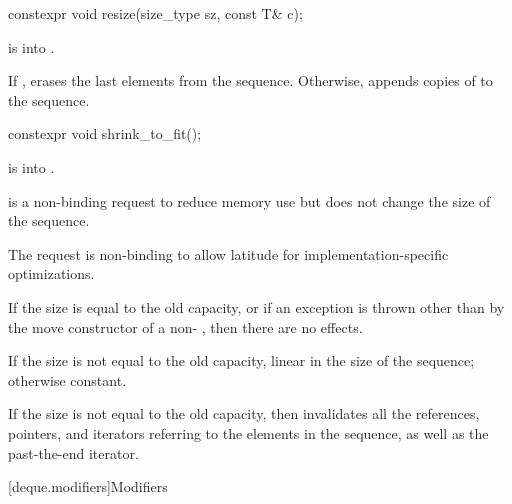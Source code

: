 %
\begin{itemdecl}
constexpr void resize(size_type sz, const T& c);
\end{itemdecl}

\begin{itemdescr}
\pnum
\expects
{} is  into .

\pnum
\effects
If , erases the last  elements
from the sequence. Otherwise,
appends  copies of  to the sequence.
\end{itemdescr}

%
\begin{itemdecl}
constexpr void shrink_to_fit();
\end{itemdecl}

\begin{itemdescr}
\pnum
\expects
{} is  into .

\pnum
\effects
{} is a non-binding request to reduce memory use
but does not change the size of the sequence.
\begin{note}
The request is non-binding to allow latitude for
implementation-specific optimizations.
\end{note}
If the size is equal to the old capacity, or
if an exception is thrown other than by the move constructor
of a non- ,
then there are no effects.

\pnum
\complexity
If the size is not equal to the old capacity,
linear in the size of the sequence;
otherwise constant.

\pnum
\remarks
If the size is not equal to the old capacity,
then invalidates all the references, pointers, and iterators
referring to the elements in the sequence,
as well as the past-the-end iterator.
\end{itemdescr}

[deque.modifiers]{Modifiers}


